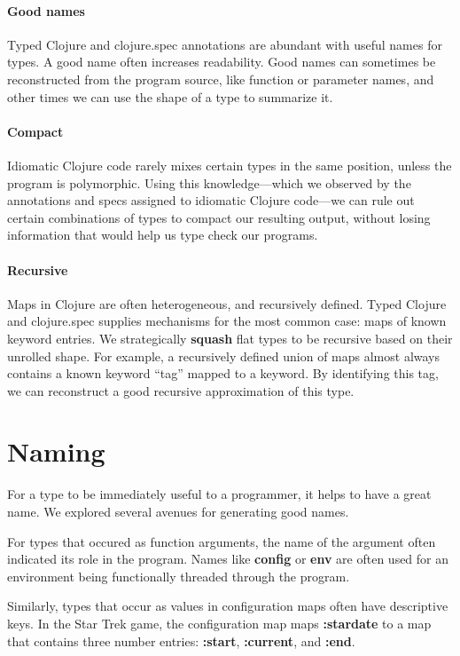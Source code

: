 \paragraph{Good names}
Typed Clojure and clojure.spec annotations are abundant
with useful names for types. A good name often increases
readability.
Good names can sometimes be reconstructed from the program source,
like function or parameter names, and other times 
we can use the shape of a type to summarize it.

\paragraph{Compact}
Idiomatic Clojure code rarely mixes certain types in the same position,
unless the program is polymorphic. Using this knowledge---which we observed
by the annotations and specs assigned to idiomatic Clojure 
code---we can rule out certain combinations of types to compact our
resulting output, without losing information that would help us
type check our programs.

\paragraph{Recursive}
Maps in Clojure are often heterogeneous, and recursively defined.
Typed Clojure and clojure.spec supplies mechanisms for the most
common case: maps of known keyword entries.
We strategically \textbf{squash} flat types to be recursive
based on their unrolled shape.
For example, a recursively defined union of maps almost always
contains a known keyword ``tag'' mapped to a keyword.
By identifying this tag, we can reconstruct a good recursive
approximation of this type.

\section{Naming}

For a type to be immediately useful to a programmer, it helps
to have a great name. We explored several avenues for
generating good names.

For types that occured as function arguments, the name of
the argument often indicated its role in the program.
Names like \textbf{config} or \textbf{env} are often used
for an environment being functionally threaded through
the program.

Similarly, types that occur as values in configuration
maps often have descriptive keys. In the Star Trek 
game, the configuration map maps \textbf{:stardate}
to a map that contains three number entries: 
\textbf{:start},
\textbf{:current}, and
\textbf{:end}.

